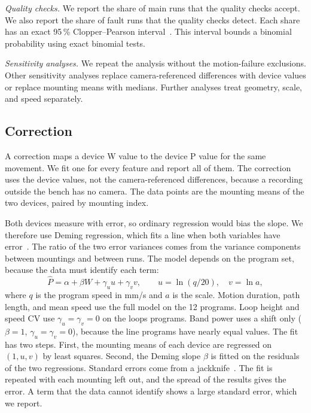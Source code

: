 \emph{Quality checks.}
We report the share of main runs that the quality checks accept.
We also report the share of fault runs that the quality checks detect.
Each share has an exact 95\,\% Clopper--Pearson interval~\cite{Clopper1934}.
This interval bounds a binomial probability using exact binomial tests.

\emph{Sensitivity analyses.}
We repeat the analysis without the motion-failure exclusions.
Other sensitivity analyses replace camera-referenced differences with device values or replace mounting means with medians.
Further analyses treat geometry, scale, and speed separately.

\subsection{Correction}
\label{sec:correction}
A correction maps a device W value to the device P value for the same movement.
We fit one for every feature and report all of them.
The correction uses the device values, not the camera-referenced differences, because a recording outside the bench has no camera.
The data points are the mounting means of the two devices, paired by mounting index.

Both devices measure with error, so ordinary regression would bias the slope.
We therefore use Deming regression, which fits a line when both variables have error~\cite{Linnet1993}.
The ratio of the two error variances comes from the variance components between mountings and between runs.
The model depends on the program set, because the data must identify each term:
\begin{equation}
\hat{P}=\alpha+\beta W+\gamma_u u+\gamma_v v,\qquad u=\ln(q/20),\quad v=\ln a ,
\label{eq:correction}
\end{equation}
where $q$ is the program speed in mm/s and $a$ is the scale.
Motion duration, path length, and mean speed use the full model on the 12 programs.
Loop height and speed CV use $\gamma_u=\gamma_v=0$ on the loops programs.
Band power uses a shift only ($\beta=1$, $\gamma_u=\gamma_v=0$), because the line programs have nearly equal values.
The fit has two steps.
First, the mounting means of each device are regressed on $(1,u,v)$ by least squares.
Second, the Deming slope $\beta$ is fitted on the residuals of the two regressions.
Standard errors come from a jackknife~\cite{Efron1981}.
The fit is repeated with each mounting left out, and the spread of the results gives the error.
A term that the data cannot identify shows a large standard error, which we report.

